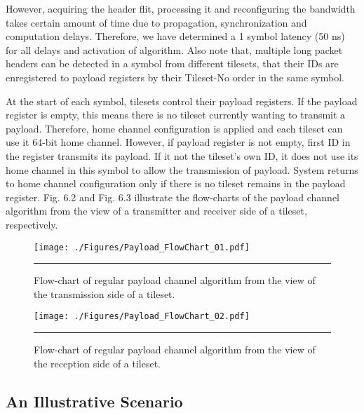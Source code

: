 However, acquiring the header flit, processing it and reconfiguring the bandwidth takes certain amount of time due to propagation, synchronization and computation delays. Therefore, we have determined a 1 symbol latency (50 ns) for all delays and activation of algorithm. Also note that, multiple long packet headers can be detected in a symbol from different tilesets, that their IDs are enregistered to payload registers by their Tileset-No order in the same symbol. 

At the start of each symbol, tilesets control their payload registers. If the payload register is empty, this means there is no tileset currently wanting to transmit a payload. Therefore, home channel configuration is applied and each tileset can use it 64-bit home channel. However, if payload register is not empty, first ID in the register transmits its payload. If it not the tileset's own ID, it does not use its home channel in this symbol to allow the transmission of payload. System returns to home channel configuration only if there is no tileset remains in the payload register. Fig. 6.2 and Fig. 6.3 illustrate the flow-charts of the payload channel algorithm from the view of a transmitter and receiver side of a tileset, respectively. 

\begin{figure}[htbp]
  \centering
    \texttt{[image: ./Figures/Payload\_FlowChart\_01.pdf]}
    \rule{35em}{0.5pt}
  \caption[Flow-chart of regular payload channel algorithm from the view of the transmission side of a tileset.]{Flow-chart of regular payload channel algorithm from the view of the transmission side of a tileset.} 
  \label{fig:Electron}
\end{figure}



\begin{figure}[htbp]
  \centering
    \texttt{[image: ./Figures/Payload\_FlowChart\_02.pdf]}
    \rule{35em}{0.5pt}
  \caption[Flow-chart of regular payload channel algorithm from the view of the reception side of a tileset.]{Flow-chart of regular payload channel algorithm from the view of the reception side of a tileset.} 
  \label{fig:Electron}
\end{figure}

\subsection{An Illustrative Scenario}


